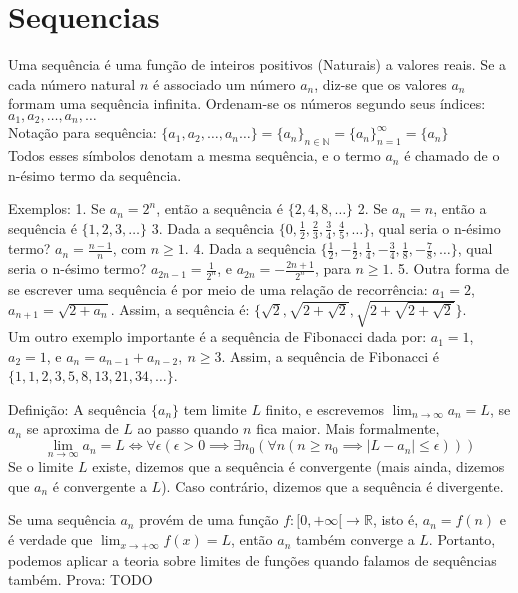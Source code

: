 \hypertarget{sequencias}{%
\section{Sequencias}\label{sequencias}}

Uma sequência é uma função de inteiros positivos (Naturais) a valores
reais. Se a cada número natural \(n\) é associado um número \(a_n\),
diz-se que os valores \(a_n\) formam uma sequência infinita. Ordenam-se
os números segundo seus índices: \(a_1, a_2, \dots, a_n, \dots\)\\
Notação para sequência:
\(\{a_1, a_2, \dots, a_n \dots\} = \{a_n\}_{n \in \mathbb{N}} = \{a_n\}_{n=1}^\infty = \{a_n\}\)\\
Todos esses símbolos denotam a mesma sequência, e o termo \(a_n\) é
chamado de o n-ésimo termo da sequência.

Exemplos: 1. Se \(a_n = 2^n\), então a sequência é
\(\{2, 4, 8, \dots\}\) 2. Se \(a_n = n\), então a sequência é
\(\{1, 2, 3, \dots\}\) 3. Dada a sequência
\(\{0, \frac{1}{2}, \frac{2}{3}, \frac{3}{4}, \frac{4}{5}, \dots\}\),
qual seria o n-ésimo termo? \(a_n = \frac{n-1}{n}\), com \(n \geq 1\).
4. Dada a sequência
\(\{\frac{1}{2}, -\frac{1}{2}, \frac{1}{4}, -\frac{3}{4}, \frac{1}{8}, -\frac{7}{8}, \dots\}\),
qual seria o n-ésimo termo? \(a_{2n - 1} = \frac{1}{2^n}\), e
\(a_{2n} = -\frac{2n + 1}{2^n}\), para \(n \geq 1\). 5. Outra forma de
se escrever uma sequência é por meio de uma relação de recorrência:
\(a_1 = 2\), \(a_{n+1} = \sqrt{2 + a_n}\). Assim, a sequência é:
\(\{\sqrt{2}, \sqrt{2 + \sqrt{2}}, \sqrt{2 + \sqrt{2 + \sqrt{2}}}\}\).\\
Um outro exemplo importante é a sequência de Fibonacci dada por:
\(a_1 = 1\), \(a_2 = 1\), e \(a_n = a_{n - 1} + a_{n - 2}, \ n \geq 3\).
Assim, a sequência de Fibonacci é
\(\{1, 1, 2, 3, 5, 8, 13, 21, 34, \dots\}\).

Definição: A sequência \(\{a_n\}\) tem limite \(L\) finito, e escrevemos
\(\lim_{n \to \infty} a_n = L\), se \(a_n\) se aproxima de \(L\) ao
passo quando \(n\) fica maior. Mais formalmente, \[
\lim_{n \to \infty} a_n = L
\iff
\forall \epsilon(\epsilon > 0 \implies \exists n_0(\forall n(n \geq n_0 \implies |L - a_n| \leq \epsilon)))
\] Se o limite \(L\) existe, dizemos que a sequência é convergente (mais
ainda, dizemos que \(a_n\) é convergente a \(L\)). Caso contrário,
dizemos que a sequência é divergente.

Se uma sequência \(a_n\) provém de uma função
\(f:[0, +\infty[ \to \mathbb{R}\), isto é, \(a_n = f(n)\) e é verdade
que \(\lim_{x \to + \infty} f(x) = L\), então \(a_n\) também converge a
\(L\). Portanto, podemos aplicar a teoria sobre limites de funções
quando falamos de sequências também. Prova: TODO

